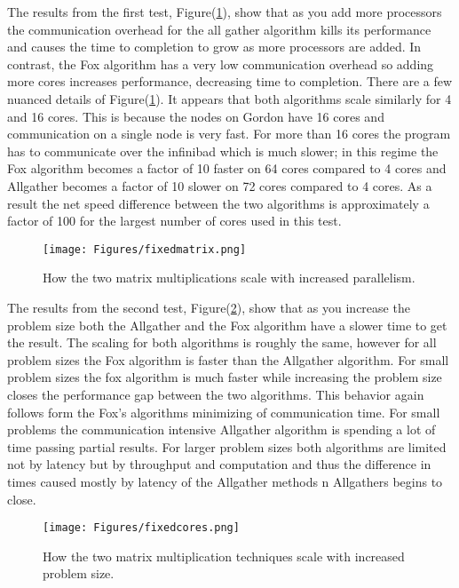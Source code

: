 \documentclass[11pt,a4paper,oneside]{report}
\begin{document}
The results from the first test, Figure(\ref{fig:fixedmatrix}), show that as you add more processors the communication overhead for the all gather algorithm kills its performance and causes the time to completion to grow as more processors are added.  In contrast, the Fox algorithm has a very low communication overhead so adding more cores increases performance, decreasing time to completion.  There are a few nuanced details of Figure(\ref{fig:fixedmatrix}).  It appears that both algorithms scale similarly for 4 and 16 cores.  This is because the nodes on Gordon have 16 cores and communication on a single node is very fast.  For more than 16 cores the program has to communicate over the infinibad which is much slower; in this regime the Fox algorithm becomes a factor of 10 faster on 64 cores compared to 4 cores and Allgather becomes a factor of 10 slower on 72 cores compared to 4 cores.  As a result the net speed difference between the two algorithms is approximately a factor of 100 for the largest number of cores used in this test.

\begin{figure}[htpb]
  \centering
  \texttt{[image: Figures/fixedmatrix.png]}
  \caption{How the two matrix multiplications scale with increased parallelism.}
  \label{fig:fixedmatrix}
\end{figure}

The results from the second test, Figure(\ref{fig:fixedcores}), show that as you increase the problem size both the Allgather and the Fox algorithm have a slower time to get the result.  The scaling for both algorithms is roughly the same, however for all problem sizes the Fox algorithm is faster than the Allgather algorithm.  For small problem sizes the fox algorithm is much faster while increasing the problem size closes the performance gap between the two algorithms.  This behavior again follows form the Fox's algorithms minimizing of communication time.  For small problems the communication intensive Allgather algorithm is spending a lot of time passing partial results.  For larger problem sizes both algorithms are limited not by latency but by throughput and computation and thus the difference in times caused mostly by latency of the Allgather methods n Allgathers begins to close.

\begin{figure}[htpb]
  \centering
  \texttt{[image: Figures/fixedcores.png]}
  \caption{How the two matrix multiplication techniques scale with increased problem size.}
  \label{fig:fixedcores}
\end{figure}
\end{document}
